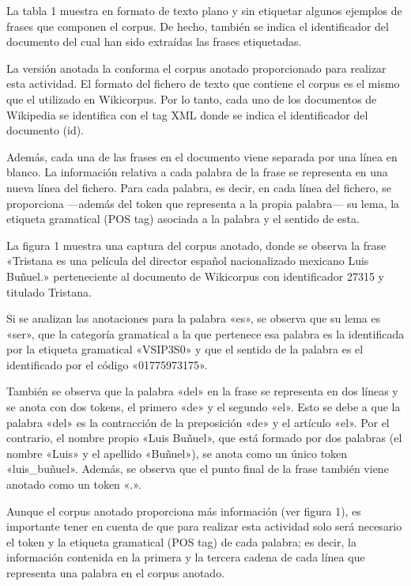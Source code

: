 \documentclass[12pt,a4paper,table]{article}
\begin{document}
La tabla 1 muestra en formato de texto plano y sin etiquetar algunos
ejemplos de frases que componen el corpus. De hecho, también se indica
el identificador del documento del cual han sido extraídas las frases
etiquetadas.

La versión anotada la conforma el corpus anotado proporcionado para
realizar esta actividad. El formato del fichero de texto que contiene el
corpus es el mismo que el utilizado en Wikicorpus. Por lo tanto, cada
uno de los documentos de Wikipedia se identifica con el tag XML donde se
indica el identificador del documento (id).

Además, cada una de las frases en el documento viene separada por una
línea en blanco. La información relativa a cada palabra de la frase se
representa en una nueva línea del fichero. Para cada palabra, es decir,
en cada línea del fichero, se proporciona ---además del token que
representa a la propia palabra--- su lema, la etiqueta gramatical (POS
tag) asociada a la palabra y el sentido de esta.

La figura 1 muestra una captura del corpus anotado, donde se observa la
frase «Tristana es una película del director español nacionalizado
mexicano Luis Buñuel.» perteneciente al documento de Wikicorpus con
identificador 27315 y titulado Tristana.

Si se analizan las anotaciones para la palabra «es», se observa que su
lema es «ser», que la categoría gramatical a la que pertenece esa
palabra es la identificada por la etiqueta gramatical «VSIP3S0» y que el
sentido de la palabra es el identificado por el código «01775973175».

También se observa que la palabra «del» en la frase se representa en dos
líneas y se anota con dos tokens, el primero «de» y el segundo «el».
Esto se debe a que la palabra «del» es la contracción de la preposición
«de» y el artículo «el». Por el contrario, el nombre propio «Luis
Buñuel», que está formado por dos palabras (el nombre «Luis» y el
apellido «Buñuel»), se anota como un único token «luis\_buñuel». Además,
se observa que el punto final de la frase también viene anotado como un
token «.».

Aunque el corpus anotado proporciona más información (ver figura 1), es
importante tener en cuenta de que para realizar esta actividad solo será
necesario el token y la etiqueta gramatical (POS tag) de cada palabra;
es decir, la información contenida en la primera y la tercera cadena de
cada línea que representa una palabra en el corpus anotado.
\end{document}
